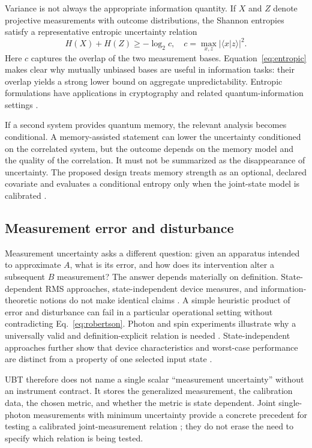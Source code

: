 \documentclass[conference]{../../../../Conference-LaTeX-template_10-17-19/IEEEtran}
\begin{document}
Variance is not always the appropriate information quantity. If $X$ and $Z$ denote projective measurements with outcome distributions, the Shannon entropies satisfy a representative entropic uncertainty relation
\begin{equation}
H(X)+H(Z) \geq -\log_2 c,
\quad c=\max_{x,z}|\langle x|z\rangle|^2.
\label{eq:entropic}
\end{equation}
Here $c$ captures the overlap of the two measurement bases. Equation~\eqref{eq:entropic} makes clear why mutually unbiased bases are useful in information tasks: their overlap yields a strong lower bound on aggregate unpredictability. Entropic formulations have applications in cryptography and related quantum-information settings \cite{coles2017}.

If a second system provides quantum memory, the relevant analysis becomes conditional. A memory-assisted statement can lower the uncertainty conditioned on the correlated system, but the outcome depends on the memory model and the quality of the correlation. It must not be summarized as the disappearance of uncertainty. The proposed design treats memory strength as an optional, declared covariate and evaluates a conditional entropy only when the joint-state model is calibrated \cite{zhang2015}.

\subsection{Measurement error and disturbance}

Measurement uncertainty asks a different question: given an apparatus intended to approximate $A$, what is its error, and how does its intervention alter a subsequent $B$ measurement? The answer depends materially on definition. State-dependent RMS approaches, state-independent device measures, and information-theoretic notions do not make identical claims \cite{ozawa2018,buscemi2014}. A simple heuristic product of error and disturbance can fail in a particular operational setting without contradicting Eq.~\eqref{eq:robertson}. Photon and spin experiments illustrate why a universally valid and definition-explicit relation is needed \cite{baek2013,erhart2012}. State-independent approaches further show that device characteristics and worst-case performance are distinct from a property of one selected input state \cite{busch2013}.

UBT therefore does not name a single scalar ``measurement uncertainty'' without an instrument contract. It stores the generalized measurement, the calibration data, the chosen metric, and whether the metric is state dependent. Joint single-photon measurements with minimum uncertainty provide a concrete precedent for testing a calibrated joint-measurement relation \cite{ringbauer2014}; they do not erase the need to specify which relation is being tested.
\end{document}
